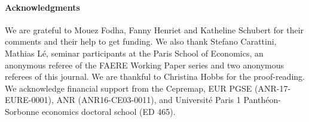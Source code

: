 \documentclass[english,5p,authoryear]{elsarticle}
\begin{document}








\paragraph*{Acknowledgments} We are grateful to Mouez Fodha, Fanny Henriet and Katheline Schubert for their comments and their help to get funding. We also thank Stefano Carattini, Mathias Lé, seminar participants at the Paris School of Economics, an anonymous referee of the FAERE Working Paper series and two anonymous referees of this journal. We are thankful to Christina Hobbs for the proof-reading. We acknowledge financial support from the Cepremap, EUR PGSE (ANR-17-EURE-0001), ANR (ANR16-CE03-0011), and Université Paris 1 Panthéon-Sorbonne economics doctoral school (ED 465).
\end{document}
